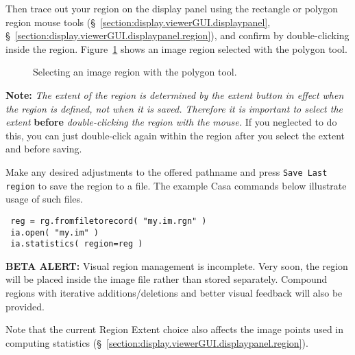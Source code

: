 Then trace out your region on the display panel using the rectangle or polygon
region mouse tools (\S~\ref{section:display.viewerGUI.displaypanel},
\S~\ref{section:display.viewerGUI.displaypanel.region}), and confirm by
double-clicking inside the region.  Figure~\ref{fig:viewer_rgnselect} shows
an image region selected with the polygon tool.

\begin{figure}[h!]
\begin{center}
\caption{\label{fig:viewer_rgnselect} Selecting an image region with the
polygon tool.}
\hrulefill
\end{center}
\end{figure}

{\bf Note:} {\it The extent of the region is determined by the extent button
in effect when the region is defined, not when it is saved.  Therefore it is
important to select the extent} {\bf before} {\it double-clicking the region
with the mouse.}  If you neglected to do this, you can just double-click
again within the region after you select the extent and before saving.

Make any desired adjustments to the offered pathname and press
{\tt Save Last region} to save the region to a file.  The example Casa
commands below illustrate usage of such files.

\begin{verbatim}
 reg = rg.fromfiletorecord( "my.im.rgn" )
 ia.open( "my.im" )
 ia.statistics( region=reg )
\end{verbatim}

{\bf BETA ALERT:} Visual region management is incomplete.  Very soon, the
region will be placed inside the image file rather than stored separately.
Compound regions with iterative additions/deletions and better visual
feedback will also be provided.

Note that the current Region Extent choice also affects the image points used
in computing statistics
(\S~\ref{section:display.viewerGUI.displaypanel.region}).



